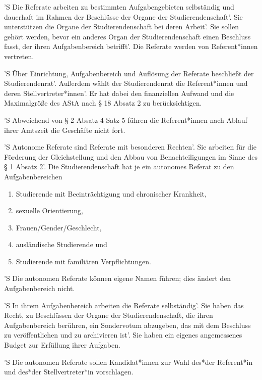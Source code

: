 \documentclass[fontsize=12pt,parskip=half]{scrartcl}
\begin{document}
\begin{contract}
  'S Die Referate arbeiten zu bestimmten Aufgabengebieten selbständig und dauerhaft
  im Rahmen der Beschlüsse der Organe der Studierendenschaft'. Sie unterstützen
  die Organe der Studierendenschaft bei deren Arbeit'. Sie sollen gehört werden,
  bevor ein anderes Organ der Studierendenschaft einen Beschluss fasst, der
  ihren Aufgabenbereich betrifft'. Die Referate werden von Referent*innen
  vertreten.

  'S Über Einrichtung, Aufgabenbereich und Auflösung der Referate beschließt der
  Studierendenrat'. Außerdem wählt der Studierendenrat die Referent*innen und
  deren Stellvertreter*innen'. Er hat dabei den finanziellen Aufwand und die
  Maximalgröße des AStA nach § 18 Absatz 2 zu berücksichtigen.

  'S Abweichend von § 2 Absatz 4 Satz 5 führen die Referent*innen nach Ablauf ihrer
  Amtszeit die Geschäfte nicht fort.



  'S Autonome Referate sind Referate mit besonderen Rechten'. Sie arbeiten für die
  Förderung der Gleichstellung und den Abbau von Benachteiligungen im Sinne des
  § 1 Absatz 2'. Die Studierendenschaft hat je ein autonomes Referat zu den
  Aufgabenbereichen
  \begin{enumerate}[\qquad 1.]
  \item Studierende mit Beeinträchtigung und chronischer Krankheit,
  \item sexuelle Orientierung,
  \item Frauen/Gender/Geschlecht,
  \item ausländische Studierende und
  \item Studierende mit familiären Verpflichtungen.
  \end{enumerate}
  'S Die autonomen Referate können eigene Namen führen; dies ändert den
  Aufgabenbereich nicht.

  'S In ihrem Aufgabenbereich arbeiten die Referate selbständig'. Sie haben das
  Recht, zu Beschlüssen der Organe der Studierendenschaft, die ihren
  Aufgabenbereich berühren, ein Sondervotum abzugeben, das mit dem Beschluss zu
  veröffentlichen und zu archivieren ist'. Sie haben ein eigenes angemessenes
  Budget zur Erfüllung ihrer Aufgaben.

  'S Die autonomen Referate sollen Kandidat*innen zur Wahl des*der Referent*in und
  des*der Stellvertreter*in vorschlagen.


\end{contract}
\end{document}

